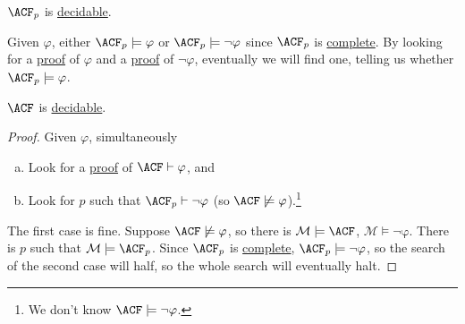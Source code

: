 \begin{remark}
	\(\ACF_p \) is \hyperref[def:decidable]{decidable}.
\end{remark}
\begin{explanation}
	Given \(\varphi \), either \(\ACF_p \models \varphi \) or \(\ACF_p \models \lnot \varphi \) since \(\ACF_p \) is \hyperref[def:theory-complete]{complete}. By looking for a \hyperref[def:proof]{proof} of \(\varphi \) and a \hyperref[def:proof]{proof} of \(\lnot \varphi \), eventually we will find one, telling us whether \(\ACF_p \models \varphi \).
\end{explanation}

\begin{theorem}
	\(\ACF \) is \hyperref[def:decidable]{decidable}.
\end{theorem}
\begin{proof}
	Given \(\varphi \), simultaneously
	\begin{enumerate}[(a)]
		\item Look for a \hyperref[def:proof]{proof} of \(\ACF \vdash \varphi \), and
		\item Look for \(p\) such that \(\ACF_p \vdash \lnot \varphi \) (so \(\ACF \not \models \varphi \)).\footnote{We don't know \(\ACF \models \lnot \varphi \).}
	\end{enumerate}
	The first case is fine. Suppose \(\ACF \not \models \varphi \), so there is \(\mathcal{M} \models \ACF\), \(\mathrm{\mathcal{M} \models \lnot \varphi } \). There is \(p\) such that \(\mathcal{M} \models \ACF_p\). Since \(\ACF_p\) is \hyperref[def:theory-complete]{complete}, \(\ACF_p \models \lnot \varphi \), so the search of the second case will half, so the whole search will eventually halt.
\end{proof}